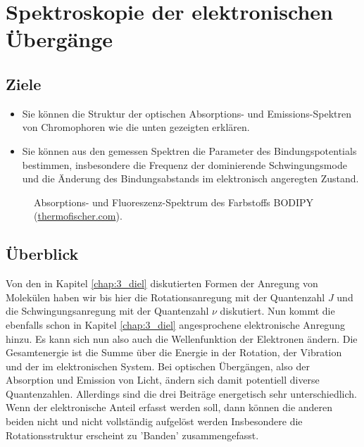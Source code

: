 
\chapter{Spektroskopie der elektronischen Übergänge}





\section{Ziele}

\begin{itemize}
\item Sie können die Struktur der optischen Absorptions- und Emissions-Spektren von Chromophoren wie die unten gezeigten erklären.

\item Sie können aus den gemessen Spektren die Parameter des Bindungspotentials bestimmen, insbesondere die Frequenz der dominierende Schwingungsmode und die Änderung des Bindungsabstands im elektronisch angeregten Zustand.

\end{itemize}


\begin{figure}
  \caption{Absorptions- und Fluoreszenz-Spektrum des Farbstoffs BODIPY  (\href{https://www.thermofisher.com/de/de/home/life-science/cell-analysis/labeling-chemistry/fluorescence-spectraviewer.html?SID=srch-svtool&UID=10001moh}{thermofischer.com}).}
\end{figure}



\section{Überblick}

Von den in Kapitel \ref{chap:3_diel} diskutierten Formen der Anregung von Molekülen haben wir bis hier die Rotationsanregung mit der Quantenzahl $J$ und die Schwingungsanregung mit der Quantenzahl $\nu$ diskutiert. Nun kommt die ebenfalls schon in Kapitel  \ref{chap:3_diel} angesprochene elektronische Anregung hinzu. Es kann sich nun also auch die Wellenfunktion der Elektronen ändern. Die Gesamtenergie ist die Summe über die Energie in der Rotation, der Vibration und der im elektronischen System. Bei optischen Übergängen, also der Absorption und Emission von Licht, ändern sich damit potentiell diverse Quantenzahlen. Allerdings sind die drei Beiträge energetisch sehr unterschiedlich. Wenn der elektronische Anteil erfasst werden soll, dann können die anderen beiden nicht und nicht vollständig aufgelöst werden  Insbesondere die Rotationsstruktur erscheint zu 'Banden' zusammengefasst.



